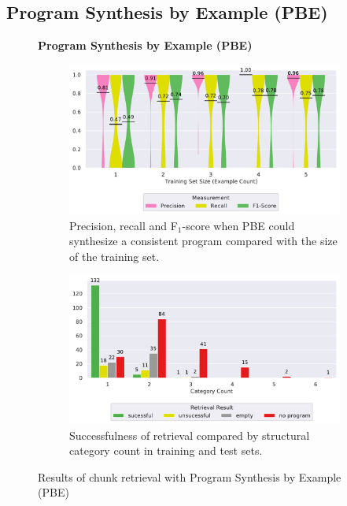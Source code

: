 \subsection{Program Synthesis by Example (PBE)}
\label{sec:r:pbe}
\begin{figure}
\centering
    \textbf{Program Synthesis by Example (PBE)}\par\medskip
\begin{subfigure}[b]{\columnwidth}
		\centering
		\includegraphics[width=\columnwidth,
		clip]{img/big-study/recall-precision-examplecount-sythesisworked-PBE.pdf}
				\caption{Precision, recall and
				F$_{1}$-score when PBE could synthesize
				a consistent program compared with the
				size of the training set.}
		\label{fig:recall-precision-examplecount-sythesisworked-PBE}
\end{subfigure}\hspace{\fill}
\begin{subfigure}[b]{\columnwidth}
		\centering
		\includegraphics[width=\columnwidth,
		clip]{img/big-study/failure-reason-categorycount-PBE.pdf}
				\caption{Successfulness of retrieval
				compared by structural category count
				in training and test sets.}
		\label{fig:failure-reason-categorycount-PBE}
\end{subfigure}
\caption{Results of chunk retrieval with  Program Synthesis by Example
(PBE)}
\end{figure}


